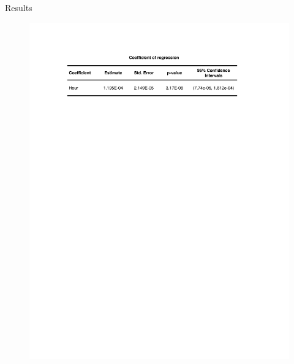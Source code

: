 \documentclass{beamer}
\begin{document}
\begin{frame}{Results}{}
	\vspace{-0.1 in}
	\begin{figure}{}
		\vspace*{-0 in}
		\scalebox{1}
		{\hspace*{-0 in}\includegraphics[scale=0.7]{coefficient.pdf} }
	\end{figure}	
	\vspace*{-0 in}
	

\end{frame}
\end{document}
